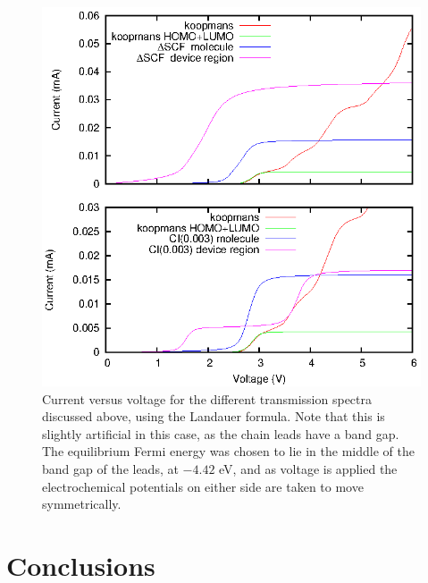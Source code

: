 \begin{figure}
	\begin{center}
		\includegraphics[width=0.9\linewidth]{figures/figure9a_9b}
	\end{center}
	\caption{Current versus voltage for the different transmission
	         spectra discussed above, using the Landauer formula.
		 Note that this is slightly artificial in this case, as
		 the chain leads have a band gap. The equilibrium Fermi
		 energy was chosen to lie in the middle of the band gap
		 of the leads, at $-4.42$ eV, and as voltage is applied
		 the electrochemical potentials on either side are taken
		 to move symmetrically.}
	\label{fig:iv}
\end{figure}
 
\section{Conclusions}
\label{sec:conclusions}


